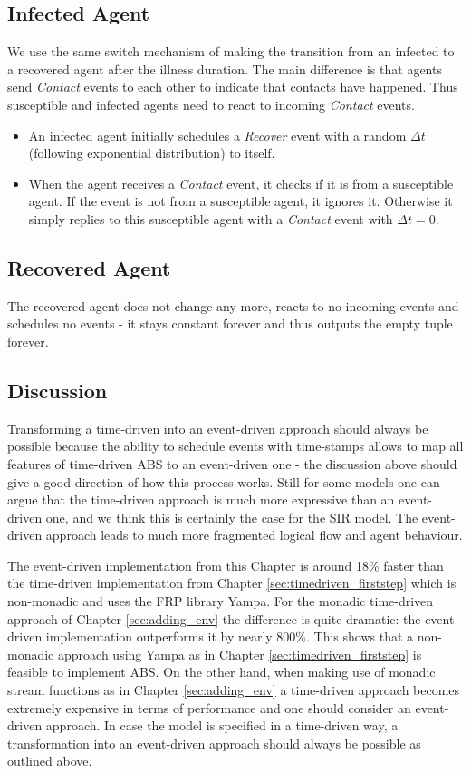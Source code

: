 \subsection{Infected Agent}
We use the same switch mechanism of making the transition from an infected to a recovered agent after the illness duration. The main difference is that agents send \textit{Contact} events to each other to indicate that contacts have happened. Thus susceptible and infected agents need to react to incoming \textit{Contact} events.

\begin{itemize}
	\item An infected agent initially schedules a \textit{Recover} event with a random $\Delta t$ (following exponential distribution) to itself.
	\item When the agent receives a \textit{Contact} event, it checks if it is from a susceptible agent. If the event is not from a susceptible agent, it ignores it. Otherwise it simply replies to this susceptible agent with a \textit{Contact} event with $\Delta t = 0$.
\end{itemize}

\subsection{Recovered Agent}
The recovered agent does not change any more, reacts to no incoming events and schedules no events - it stays constant forever and thus outputs the empty tuple forever.

\subsection{Discussion}
Transforming a time-driven into an event-driven approach should always be possible because the ability to schedule events with time-stamps allows to map all features of time-driven ABS to an event-driven one - the discussion above should give a good direction of how this process works. Still for some models one can argue that the time-driven approach is much more expressive than an event-driven one, and we think this is certainly the case for the SIR model. The event-driven approach leads to much more fragmented logical flow and agent behaviour. 

The event-driven implementation from this Chapter is around 18\% faster than the time-driven implementation from Chapter \ref{sec:timedriven_firststep} which is non-monadic and uses the FRP library Yampa. For the monadic time-driven approach of Chapter \ref{sec:adding_env} the difference is quite dramatic: the event-driven implementation outperforms it by nearly 800\%. This shows that a non-monadic approach using Yampa as in Chapter \ref{sec:timedriven_firststep} is feasible to implement ABS. On the other hand, when making use of monadic stream functions as in Chapter \ref{sec:adding_env} a time-driven approach becomes extremely expensive in terms of performance and one should consider an event-driven approach. In case the model is specified in a time-driven way, a transformation into an event-driven approach should always be possible as outlined above.